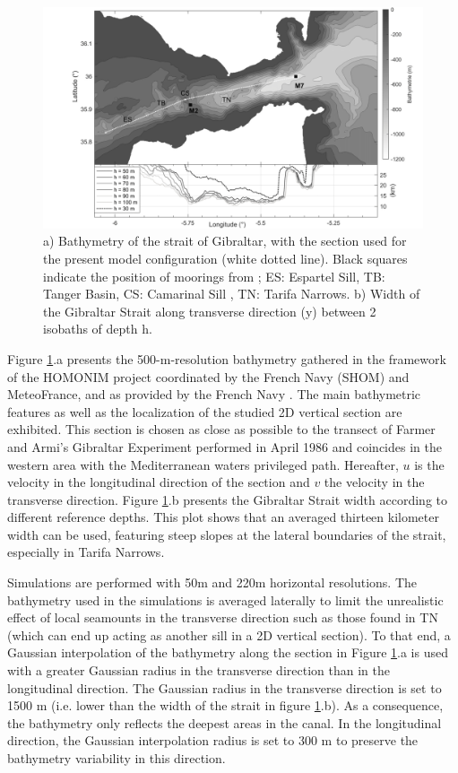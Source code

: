 \begin{figure}[!h]
\centering
 \includegraphics[width=1\textwidth]{./GBR2D/figure2.png}
 \caption { a) Bathymetry of the strait of Gibraltar, with the section used for the present model configuration (white dotted line). Black squares indicate the position of moorings from \citet{CW90}; ES: Espartel Sill, TB: Tanger Basin, CS: Camarinal Sill , TN: Tarifa Narrows. b) Width of the Gibraltar Strait along transverse direction (y) between 2 isobaths of depth h.}
 \label{Fig1}
\end{figure}

\indent Figure \ref{Fig1}.a presents the 500-m-resolution bathymetry gathered in the framework of the HOMONIM project coordinated by the French Navy (SHOM) and MeteoFrance, and as provided by the French Navy \citep{Biscara2016}. The  main bathymetric features as well as the localization of the studied 2D vertical section are exhibited. This section is chosen as close as possible to the transect of Farmer and Armi's Gibraltar Experiment performed in April 1986 \citep{FA1988} and coincides in the western area with the Mediterranean waters privileged path. Hereafter, $u$ is the velocity in the longitudinal direction of the section and $v$ the velocity in the transverse direction. Figure \ref{Fig1}.b presents the Gibraltar Strait width according to different reference depths. This plot shows that an averaged thirteen kilometer width can be used, featuring steep slopes at the lateral boundaries of the strait, especially in Tarifa Narrows.

Simulations are performed with 50m and 220m horizontal resolutions. The bathymetry used in the simulations is averaged laterally to limit the unrealistic effect of local seamounts in the transverse direction such as those found in TN (which can end up acting as another sill in a 2D vertical section). To that end, a Gaussian interpolation of the bathymetry along the section in Figure \ref{Fig1}.a is used with a greater Gaussian radius in the transverse direction than in the longitudinal direction. The Gaussian radius in the transverse direction is set to 1500 m (i.e. lower than the width of the strait in figure \ref{Fig1}.b). As a consequence, the bathymetry only reflects the deepest areas in the canal. In the longitudinal direction, the Gaussian interpolation radius is set to 300 m to preserve the bathymetry variability in this direction.

